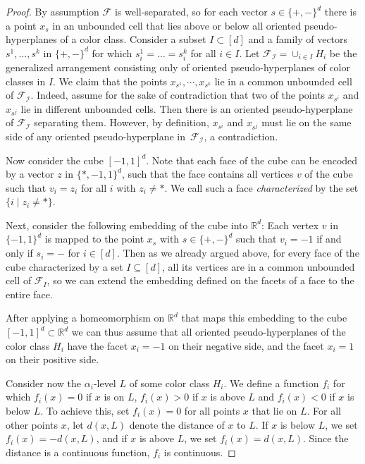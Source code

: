 \documentclass[a4paper,UKenglish,cleveref, autoref, thm-restate, nolineno]{socg-lipics-v2021}
\newcommand{\R}{\mathbb{R}}
\begin{document}
\begin{proof}
By assumption $\mathcal{F}$ is well-separated, so for each vector $s \in \{+, -\}^d$ there is a point $x_s$ in an unbounded cell that lies above or below all oriented pseudo-hyperplanes of a color class. Consider a subset $I\subset [d]$ and a family of vectors $s^1,\ldots,s^k$ in $\{+, -\}^d$ for which $s_i^1=\ldots =s_i^k$ for all $i\in I$. Let $\mathcal{F_{I}}=\cup_{i\in I} H_i$ be the generalized arrangement consisting only of oriented pseudo-hyperplanes of color classes in $I$. We claim that the points $x_{s^1},\cdots,x_{s^k}$ lie in a common unbounded cell of $\mathcal{F_{I}}$. Indeed, assume for the sake of contradiction that two of the points $x_{s^i}$ and $x_{s^j}$ lie in different unbounded cells. Then there is an oriented pseudo-hyperplane of $\mathcal{F_{I}}$ separating them. However, by definition, $x_{s^i}$ and $x_{s^j}$ must lie on the same side of any oriented pseudo-hyperplane in~$\mathcal{F_{I}}$, a contradiction.

 
Now consider the cube $[-1,1]^d$.
Note that each face of the cube can be encoded by a vector $z$ in $\{*,-1,1\}^d$, such that the face contains all vertices $v$ of the cube such that $v_i = z_i$ for all $i$ with $z_i \neq *$.
We call such a face \emph{characterized} by the set $\{i \mid z_i \neq *\}$. 

Next, consider the following embedding of the cube into $\R^d$: Each vertex $v$ in $\{-1,1\}^d$ is mapped to the point $x_s$ with $s \in \{+,-\}^d$ such that $v_i = -1$ if and only if $s_i = -$ for $i \in [d]$.
Then as we already argued above, for every face of the cube characterized by a set $I \subseteq [d]$, all its vertices are in a common unbounded cell of $\mathcal{F}_I$, so we can extend the embedding defined on the facets of a face to the entire face.

After applying a homeomorphism on $\mathbb{R}^d$ that maps this embedding to the cube $[-1,1]^d\subset\mathbb{R}^d$ we can thus assume that all oriented pseudo-hyperplanes of the color class $H_i$ have the facet $x_i=-1$ on their negative side, and the facet $x_i=1$ on their positive side.

Consider now the $\alpha_i$-level $L$ of some color class $H_i$. We define a function $f_i$ for which $f_i(x)=0$ if $x$ is on $L$, $f_i(x)>0$ if $x$ is above $L$ and $f_i(x)<0$ if $x$ is below $L$. To achieve this, set $f_i(x) = 0$ for all points $x$ that lie on $L$. For all other points $x$, let $d(x, L)$ denote the distance of $x$ to $L$. If $x$ is below $L$, we set $f_i(x) = -d(x, L)$, and if $x$ is above $L$, we set $f_i(x) = d(x, L)$. Since the distance is a continuous function, $f_i$ is continuous. 


\end{proof}
\end{document}
